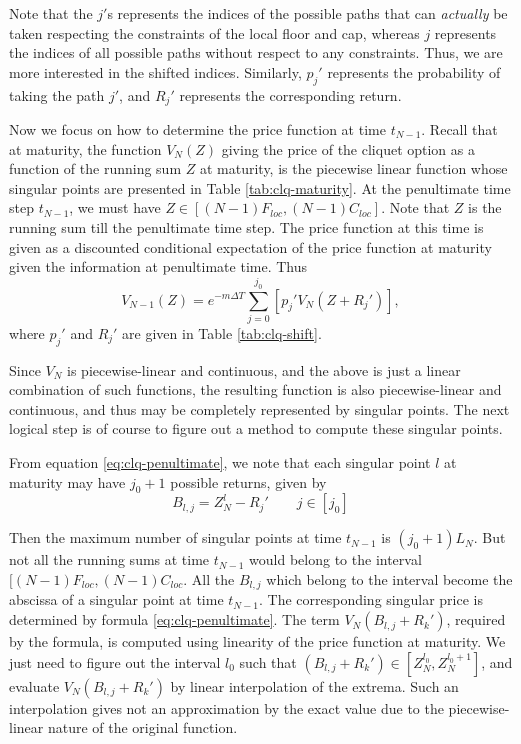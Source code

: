 \begin{rem}
	\label{rem:clq-shift}
	Note that the $ j' $s represents the indices of the possible paths that can \emph{actually} be taken respecting the constraints of the local floor and cap, whereas $ j $ represents the indices of all possible paths without respect to any constraints. Thus, we are more interested in the shifted indices. Similarly, $ p_j' $ represents the probability of taking the path $ j' $, and $ R_j' $ represents the corresponding return.
\end{rem}

Now we focus on how to determine the price function at time $ t_{N - 1} $. Recall that at maturity, the function $ V_{N}(Z) $ giving the price of the cliquet option as a function of the running sum $ Z $ at maturity, is the piecewise linear function whose singular points are presented in Table \ref{tab:clq-maturity}. At the penultimate time step $ t_{N - 1} $, we must have $ Z \in [ (N-1) F_{loc}, (N-1) C_{loc} ] $. Note that $ Z $ is the running sum till the penultimate time step. The price function at this time is given as a discounted conditional expectation of the price function at maturity given the information at penultimate time. Thus
\begin{equation}
	\label{eq:clq-penultimate}
	V_{N-1} (Z) = e^{- m \Delta T} \sum_{j=0}^{j_0} \left[ p_j' V_{N} (Z + R_j') \right] ,
\end{equation}
where $ p_j' $ and $ R_j' $ are given in Table \ref{tab:clq-shift}.

Since $ V_{N} $ is piecewise-linear and continuous, and the above is just a linear combination of such functions, the resulting function is also piecewise-linear and continuous, and thus may be completely represented by singular points. The next logical step is of course to figure out a method to compute these singular points.

From equation \ref{eq:clq-penultimate}, we note that each singular point $ l $ at maturity may have $ j_0 + 1 $ possible returns, given by
\begin{equation}
	\label{eq:clq-b}
	B_{l,j} = Z_N^l - R_j' \qquad j \in [j_0]
\end{equation}

Then the maximum number of singular points at time $ t_{N-1} $ is $ ( j_0 + 1 ) L_N $. But not all the running sums at time $ t_{N-1} $ would belong to the interval $ [ (N-1) F_{loc}, (N-1) C_{loc} $. All the $ B_{l,j} $ which belong to the interval become the abscissa of a singular point at time $ t_{N-1} $. The corresponding singular price is determined by formula \ref{eq:clq-penultimate}. The term $ V_{N} (B_{l,j} + R_k') $, required by the formula, is computed using linearity of the price function at maturity. We just need to figure out the interval $ l_0 $ such that $ ( B_{l,j} + R_k' ) \in [ Z_N^{l_0}, Z_N^{l_0 + 1} ] $, and evaluate $ V_{N} (B_{l,j} + R_k') $ by linear interpolation of the extrema. Such an interpolation gives not an approximation by the exact value due to the piecewise-linear nature of the original function.

